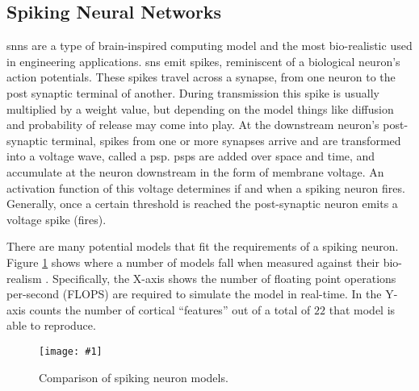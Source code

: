 \documentclass[conference]{IEEEtran}
\newcommand{\afigf}[3]{
	\begin{figure}[h]
    	\centering
		\texttt{[image: \#1]}
        \caption{#2.}
        \label{#3}
	\end{figure}
}
\begin{document}
\subsection{Spiking Neural Networks}
\glspl{snn} are a type of brain-inspired computing model and the most
bio-realistic used in engineering applications. \glspl{sn} emit spikes,
reminiscent of a biological neuron's action potentials. These spikes travel
across a synapse, from one neuron to the post synaptic terminal of
another. During transmission this spike is usually multiplied by a weight value,
but depending on the model things like diffusion and probability of release may
come into play. At the downstream neuron's post-synaptic terminal, spikes from
one or more synapses arrive and are transformed into a voltage wave, called a
\gls{psp}. \glspl{psp} are added over space and time, and accumulate at the
neuron downstream in the form of membrane voltage. An activation function of
this voltage determines if and when a spiking neuron fires. Generally,
once a certain threshold is reached the post-synaptic neuron emits a voltage
spike (fires).



There are many potential models that fit the requirements of a spiking
neuron. Figure \ref{fig:sn_model_compare} shows where a number of models fall
when measured against their bio-realism
\parencite{izhikevich_2004}. Specifically, the X-axis shows the number of
floating point operations per-second (FLOPS) are required to simulate the model
in real-time. In the Y-axis counts the number of cortical ``features'' out of a
total of $22$ that model is able to reproduce.
    
\afigf{figures/sn-model-compare.png}{Comparison of spiking neuron
  models}{fig:sn_model_compare}
\end{document}
